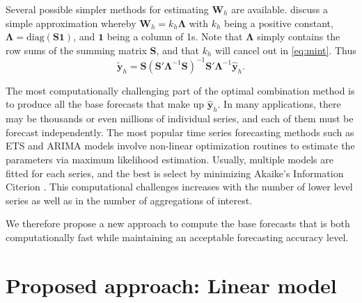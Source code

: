 \documentclass[11pt,a4paper,]{article}
\begin{document}
Several possible simpler methods for estimating \(\bm{W}_h\) are
available. \textcite{mint2018} discuss a simple approximation whereby
\(\bm{W}_h = k_h \bm{\Lambda}\) with \(k_h\) being a positive constant,
\(\bm{\Lambda} = \text{diag}(\bm{S}\bm{1})\), and \(\bm{1}\) being a
column of 1s. Note that \(\bm{\Lambda}\) simply contains the row sums of
the summing matrix \(\bm{S}\), and that \(k_h\) will cancel out in
\eqref{eq:mint}. Thus \begin{equation}\label{eq:mint2}
  \tilde{\bm{y}}_{h}=\bm{S}(\bm{S}'\bm{\Lambda}^{-1}\bm{S})^{-1}\bm{S}'\bm{\Lambda}^{-1}\hat{\bm{y}}_h.
\end{equation}

The most computationally challenging part of the optimal combination
method is to produce all the base forecasts that make up
\(\hat{\bm{y}}_h\). In many applications, there may be thousands or even
millions of individual series, and each of them must be forecast
independently. The most popular time series forecasting methods such as
ETS and ARIMA models \autocite{fpp2} involve non-linear optimization
routines to estimate the parameters via maximum likelihood estimation.
Usually, multiple models are fitted for each series, and the best is
select by minimizing Akaike's Information Citerion
\autocite{akaike1998information}. This computational challenges
increases with the number of lower level series as well as in the number
of aggregations of interest.

We therefore propose a new approach to compute the base forecasts that
is both computationally fast while maintaining an acceptable forecasting
accuracy level.

\hypertarget{proposed-approach-linear-model}{%
\section{\texorpdfstring{Proposed approach: Linear model
\label{sec:proposedapproach1}}{Proposed approach: Linear model }}\label{proposed-approach-linear-model}}
\end{document}
